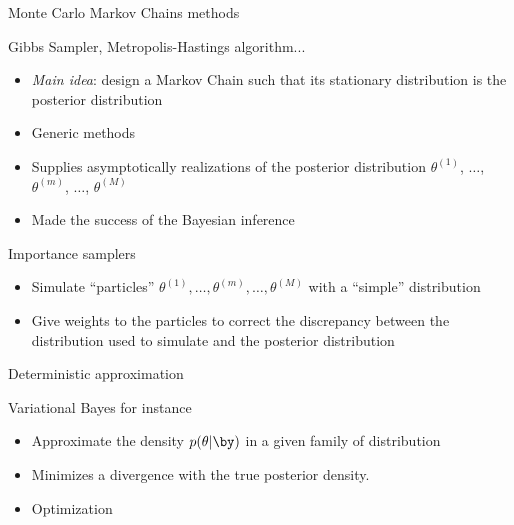 
\begin{frame}{Monte Carlo Markov Chains methods }

Gibbs Sampler, Metropolis-Hastings algorithm...
\begin{itemize}
\item \vert\emph{Main idea}\color{black}: design a Markov Chain such that its stationary distribution is the posterior distribution
\item Generic methods
\item Supplies asymptotically realizations of the posterior distribution $\theta^{(1)}$, $\dots$, $\theta^{(m)}$, $\dots$, $\theta^{(M)}$
\item Made the success of the Bayesian inference
\end{itemize}
\end{frame}


\begin{frame}{Importance samplers}
\begin{itemize}
 \item Simulate ``particles''  $\theta^{(1)}, \dots, \theta^{(m)}, \dots, \theta^{(M)}$ with a ``simple'' distribution
  \item Give weights to the particles to correct the discrepancy between the distribution used to simulate and the posterior distribution
 \end{itemize}
\end{frame}
\begin{frame}{Deterministic approximation}

Variational Bayes for instance
 \begin{itemize}
 \item Approximate the density $p(\theta | \by)$ in a given family of distribution 
 \item Minimizes a divergence with the true posterior density.  
  \item Optimization
\end{itemize}
 

 
\end{frame}



